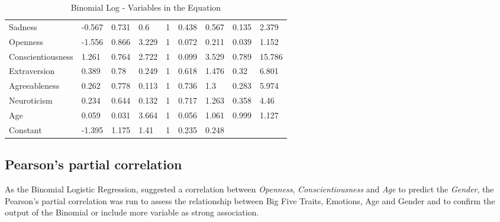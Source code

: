 \documentclass{llncs}
\begin{document}
\begin{table}[!ht]
\begin{tabular}{@{}lllllllll@{}}
Sadness           & -0.567             & 0.731                 & 0.6                   & 1                   & 0.438                 & 0.567                   & 0.135               & 2.379    \\
Openness          & -1.556             & 0.866                 & 3.229                 & 1                   & 0.072                 & 0.211                   & 0.039               & 1.152    \\
Conscientiousness & 1.261              & 0.764                 & 2.722                 & 1                   & 0.099                 & 3.529                   & 0.789               & 15.786   \\
Extraversion      & 0.389              & 0.78                  & 0.249                 & 1                   & 0.618                 & 1.476                   & 0.32                & 6.801    \\
Agreeableness     & 0.262              & 0.778                 & 0.113                 & 1                   & 0.736                 & 1.3                     & 0.283               & 5.974    \\
Neuroticism       & 0.234              & 0.644                 & 0.132                 & 1                   & 0.717                 & 1.263                   & 0.358               & 4.46     \\
Age               & 0.059              & 0.031                 & 3.664                 & 1                   & 0.056                 & 1.061                   & 0.999               & 1.127    \\
Constant          & -1.395             & 1.175                 & 1.41                  & 1                   & 0.235                 & 0.248                   &                     &          \\ \bottomrule
\end{tabular}
\caption{Binomial Log - Variables in the Equation}
\label{tbl:VariablesintheEquation}
\end{table}



\subsection{Pearson's partial correlation}
As the Binomial Logistic Regression, suggested a correlation between \emph{Openness}, \emph{Conscientiousness} and \emph{Age} to predict the \emph{Gender}, the Pearson's partial correlation was run to assess the relationship between Big Five Traits, Emotions, Age and Gender and to confirm the output of the Binomial or include more variable as strong association.
\end{document}
